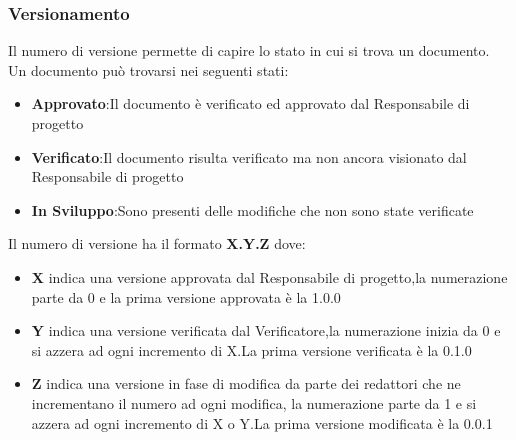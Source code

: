 \subsubsection{Versionamento}
Il numero di versione permette di capire lo stato in cui si trova un documento.
Un documento può trovarsi nei seguenti stati:
\begin{itemize} 
    \item \textbf{Approvato}:Il documento è verificato ed approvato dal Responsabile di progetto
    \item \textbf{Verificato}:Il documento risulta verificato ma non ancora visionato dal Responsabile di progetto
    \item \textbf{In Sviluppo}:Sono presenti delle modifiche che non sono state verificate
\end{itemize}
Il numero di versione ha il formato \textbf{X.Y.Z} dove:
\begin{itemize} 
    \item \textbf{X} indica una versione approvata dal Responsabile di progetto,la numerazione parte da 0
    e la prima versione approvata è la 1.0.0
    \item \textbf{Y} indica una versione verificata dal Verificatore,la numerazione inizia da 0 e si azzera ad ogni incremento di X.La prima versione
    verificata è la 0.1.0
    \item \textbf{Z} indica una versione in fase di modifica da parte dei redattori che ne incrementano il numero ad ogni modifica,
    la numerazione parte da 1 e si azzera ad ogni incremento di X o Y.La prima versione modificata è la 0.0.1
\end{itemize}

